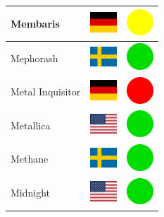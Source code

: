 \documentclass[12pt, a4paper, twoside]{report}
\begin{document}
\begin{center}
\begin{longtable}{|p{5cm}|p{2cm}|p{2cm}|}
Membaris & \includegraphics[width=1cm]{4x3/de} & \includegraphics[width=1cm]{likes/m} \\ \hline
Mephorash & \includegraphics[width=1cm]{4x3/se} & \includegraphics[width=1cm]{likes/y} \\ \hline
Metal Inquisitor & \includegraphics[width=1cm]{4x3/de} & \includegraphics[width=1cm]{likes/n} \\ \hline
Metallica & \includegraphics[width=1cm]{4x3/us} & \includegraphics[width=1cm]{likes/y} \\ \hline
Methane & \includegraphics[width=1cm]{4x3/se} & \includegraphics[width=1cm]{likes/y} \\ \hline
Midnight & \includegraphics[width=1cm]{4x3/us} & \includegraphics[width=1cm]{likes/y} \\ \hline

\end{longtable}
\end{center}
\end{document}

